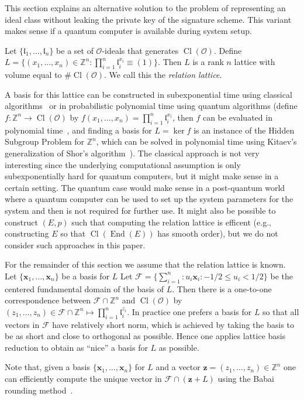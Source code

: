\documentclass{llncs}
\newcommand{\FF}{\mathcal{F}}
\newcommand{\OO}{\mathcal{O}}
\newcommand{\Z}{\mathbb{Z}}
\DeclareMathOperator{\End}{End}
\DeclareMathOperator{\Cl}{Cl}
\renewcommand{\l}{\mathfrak{l}}
\newcommand{\x}{\mathbf{x}}
\newcommand{\z}{\mathbf{z}}
\begin{document}
This section explains an alternative solution to the problem of representing an ideal class without leaking the private key of the signature scheme.
This variant makes sense if a quantum computer is available during system setup.


Let $\{ \l_1, \dots, \l_n \}$ be a set of $\OO$-ideals that generates $\Cl( \OO )$.
Define $L = \{ (x_1, \dots, x_n ) \in \Z^n : \prod_{i=1}^n \l_i^{x_i} \equiv (1) \}$.
Then $L$ is a rank $n$ lattice with volume equal to $\#\Cl(\OO)$.
We call this the \emph{relation lattice}.

A basis for this lattice can be constructed in subexponential time using classical algorithms~\cite{hafner1989rigorous,biasse_fieker_jacobson_2016} or in probabilistic polynomial time using quantum algorithms (define $f:\Z^n\to\Cl(\OO)$ by $f(x_1,\dots,x_n)=\prod_{i=1}^n\l_i^{x_i}$, then $f$ can be evaluated in polynomial time~\cite{shanks1989gauss,Cohen1993}, and finding a basis for $L=\ker f$ is an instance of the Hidden Subgroup Problem for $\Z^n$, which can be solved in polynomial time using Kitaev's generalization of Shor's algorithm~\cite{kitaev1995hsp}).
The classical approach is not very interesting since the underlying computational assumption is only subexponentially hard for quantum computers, but it might make sense in a certain setting.
The quantum case would make sense in a post-quantum world where a quantum computer can be used to set up the system parameters for the system and then is not required for further use.
It might also be possible to construct $(E, p )$ such that computing the relation lattice is efficent (e.g., constructing $E$ so that $\Cl( \End(E))$ has smooth order), but we do not consider such approaches in this paper.

For the remainder of this section we assume that the relation lattice is known.
Let $\{ \x_1, \dots, \x_n \}$ be a basis for $L$
Let $\FF = \{ \sum_{i=1}^n : u_i \x_i : -1/2 \le u_i < 1/2 \}$ be the centered fundamental domain of the basis of $L$.
Then there is a one-to-one correspondence between $\FF \cap \Z^n$ and $\Cl(\OO)$ by
$(z_1, \dots, z_n ) \in \FF \cap \Z^n  \mapsto \prod_{i=1}^n \l_i^{z_i}$.
In practice one prefers a basis for $L$ so that all vectors in $\FF$ have relatively short norm, which is achieved by taking the basis to be as short and close to orthogonal as possible. Hence one applies lattice basis reduction to obtain as ``nice'' a basis for $L$ as possible.

Note that, given a basis $\{ \x_1, \dots, \x_n \}$ for $L$ and a vector $\z = (z_1, \dots, z_n ) \in \Z^n$ one can efficiently compute the unique vector in $\FF \cap (\z + L )$ using the Babai rounding method~\cite{Bab86}.
\end{document}
